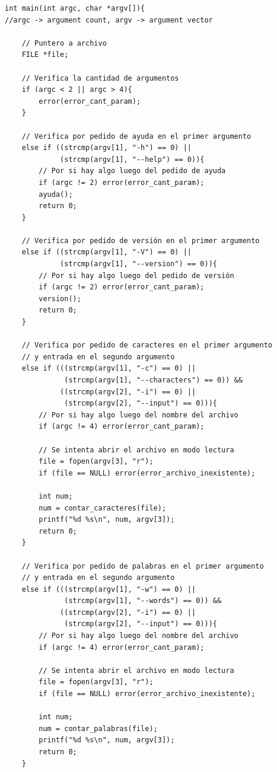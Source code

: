 \documentclass[a4paper, 10pt, twoside, notitlepage]{article}
\begin{document}
\begin{verbatim}
int main(int argc, char *argv[]){
//argc -> argument count, argv -> argument vector

    // Puntero a archivo
    FILE *file;

    // Verifica la cantidad de argumentos
    if (argc < 2 || argc > 4){
        error(error_cant_param);
    }

    // Verifica por pedido de ayuda en el primer argumento
    else if ((strcmp(argv[1], "-h") == 0) || 
             (strcmp(argv[1], "--help") == 0)){
        // Por si hay algo luego del pedido de ayuda
        if (argc != 2) error(error_cant_param);
        ayuda();
        return 0;
    }

    // Verifica por pedido de versión en el primer argumento
    else if ((strcmp(argv[1], "-V") == 0) || 
             (strcmp(argv[1], "--version") == 0)){
        // Por si hay algo luego del pedido de versión
        if (argc != 2) error(error_cant_param);
        version();
        return 0;
    }

    // Verifica por pedido de caracteres en el primer argumento 
    // y entrada en el segundo argumento
    else if (((strcmp(argv[1], "-c") == 0) || 
              (strcmp(argv[1], "--characters") == 0)) && 
             ((strcmp(argv[2], "-i") == 0) || 
              (strcmp(argv[2], "--input") == 0))){
        // Por si hay algo luego del nombre del archivo
        if (argc != 4) error(error_cant_param);

        // Se intenta abrir el archivo en modo lectura
        file = fopen(argv[3], "r");
        if (file == NULL) error(error_archivo_inexistente);

        int num;
        num = contar_caracteres(file);
        printf("%d %s\n", num, argv[3]);
        return 0;
    }

    // Verifica por pedido de palabras en el primer argumento 
    // y entrada en el segundo argumento
    else if (((strcmp(argv[1], "-w") == 0) || 
              (strcmp(argv[1], "--words") == 0)) && 
             ((strcmp(argv[2], "-i") == 0) || 
              (strcmp(argv[2], "--input") == 0))){
        // Por si hay algo luego del nombre del archivo
        if (argc != 4) error(error_cant_param);

        // Se intenta abrir el archivo en modo lectura
        file = fopen(argv[3], "r");
        if (file == NULL) error(error_archivo_inexistente);

        int num;
        num = contar_palabras(file);
        printf("%d %s\n", num, argv[3]);
        return 0;
    }


\end{verbatim}
\end{document}
